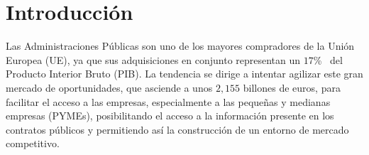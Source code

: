 \documentclass[a4paper,final,11pt,fleqn,twoside]{book}  %
\begin{document}
\title{\NombrePFC}
\author{\AutorPFC}
\date{\FechaEntregaPFC}

\frontmatter


%





\tableofcontents

\listoffigures

\listoftables

\mainmatter

\chapter{Introducción}
Las Administraciones Públicas son uno de los mayores compradores de la Unión Europea (UE), ya que
sus adquisiciones en conjunto representan un $17$\%~\cite{europeanStrategy} del Producto Interior Bruto (PIB). La tendencia se dirige a intentar 
agilizar este gran mercado de oportunidades, que asciende a unos $2,155$ billones de euros, para 
facilitar el acceso a las empresas, especialmente a las pequeñas y medianas empresas (PYMEs), posibilitando 
el acceso a la información presente en los contratos públicos y permitiendo así la construcción de un entorno de mercado competitivo.
\end{document}

